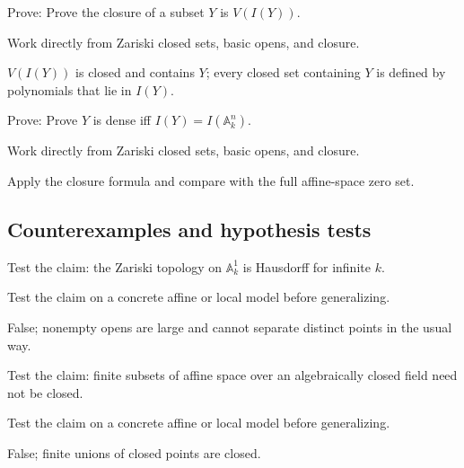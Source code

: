 \begin{exercise}\label{exr:vi02-expand-08}
Prove: Prove the closure of a subset $Y$ is $V(I(Y))$.
\end{exercise}
\begin{hint}
Work directly from Zariski closed sets, basic opens, and closure.
\end{hint}
\begin{solution}
$V(I(Y))$ is closed and contains $Y$; every closed set containing $Y$ is defined by polynomials that lie in $I(Y)$.
\end{solution}

\begin{exercise}\label{exr:vi02-expand-09}
Prove: Prove $Y$ is dense iff $I(Y)=I(\mathbb A^n_k)$.
\end{exercise}
\begin{hint}
Work directly from Zariski closed sets, basic opens, and closure.
\end{hint}
\begin{solution}
Apply the closure formula and compare with the full affine-space zero set.
\end{solution}

\subsection*{Counterexamples and hypothesis tests}

\begin{exercise}[Hausdorff]\label{exr:vi02-expand-10}
Test the claim: the Zariski topology on $\mathbb A^1_k$ is Hausdorff for infinite $k$.
\end{exercise}
\begin{hint}
Test the claim on a concrete affine or local model before generalizing.
\end{hint}
\begin{solution}
False; nonempty opens are large and cannot separate distinct points in the usual way.
\end{solution}

\begin{exercise}\label{exr:vi02-expand-11}
Test the claim: finite subsets of affine space over an algebraically closed field need not be closed.
\end{exercise}
\begin{hint}
Test the claim on a concrete affine or local model before generalizing.
\end{hint}
\begin{solution}
False; finite unions of closed points are closed.
\end{solution}

